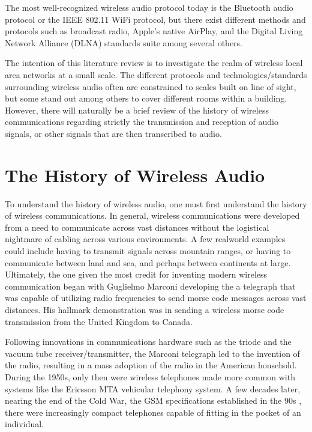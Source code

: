 \documentclass[conference]{IEEEtran}
\begin{document}
The most well-recognized wireless audio protocol today is the Bluetooth audio protocol
or the IEEE 802.11 WiFi protocol, but there exist different methods and protocols
such as broadcast radio, Apple's native AirPlay, and the Digital Living Network
Alliance (DLNA) standards suite among several others.\cite{parks_wireless_2013}

The intention of this literature review is to investigate the realm of wireless local area
networks at a small scale. The different protocols and technologies/standards
surrounding wireless audio often are constrained to scales built on line of sight,
but some stand out among others to cover different rooms within a building.
However, there will naturally be a brief review of the history of wireless
communications regarding strictly the transmission and reception of audio
signals, or other signals that are then transcribed to audio.

\section*{The History of Wireless Audio}
To understand the history of wireless audio, one must first understand the history of
wireless communications. In general, wireless communications were developed from a need to
communicate across vast distances without the logistical nightmare of cabling across various
environments. A few realworld examples could include having to transmit signals across
mountain ranges, or having to communicate between land and sea, and perhaps between
continents at large.\cite{noauthor_ericsson_2001} Ultimately, the one given the most credit
for inventing modern wireless communication began with Guglielmo Marconi developing the a
telegraph that was capable of utilizing radio frequencies to send morse code messages across
vast distances. His hallmark demonstration was in sending a wireless morse code transmission
from the United Kingdom to Canada.\cite{noauthor_ericsson_2001}

Following innovations in communications hardware such as the triode and the vacuum tube
receiver/transmitter\cite{white_pre-war_2003}, the Marconi telegraph led to the invention of
the radio, resulting in a mass adoption of the radio in the American household.\cite
{noauthor_ericsson_2001} During the 1950s, only then were wireless telephones made more
common with systems like the Ericsson MTA vehicular telephony system. A few decades later,
nearing the end of the Cold War, the GSM specifications established in the 90s
\cite{suresh_introduction_2023}, there were increasingly compact telephones capable of
fitting in the pocket of an individual.\cite{noauthor_ericsson_2001}
\end{document}
